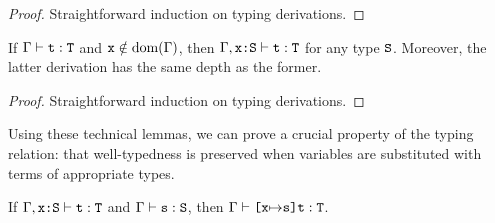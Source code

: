 \documentclass[11pt,twoside=off,numbers=noenddot]{scrbook}
\begin{document}
\begin{proof}
  Straightforward induction on typing derivations.
\end{proof}

\begin{lemma}[Weakening]
  If $\Gamma \vdash \texttt{t} : \texttt{T}$ and $\texttt{x} \notin \text{dom}(\Gamma)$,
  then $\Gamma, \texttt{x:S} \vdash \texttt{t} : \texttt{T}$ for any type
  $\texttt{S}$. Moreover, the latter derivation has the same depth as the former.
\end{lemma}

\begin{proof}
  Straightforward induction on typing derivations.
\end{proof}

Using these technical lemmas, we can prove a crucial property of the
typing relation: that well-typedness is preserved when variables are
substituted with terms of appropriate types.

\begin{lemma}
  If $\Gamma, \texttt{x:S} \vdash \texttt{t} : \texttt{T}$ and $\Gamma \vdash
  \texttt{s} : \texttt{S}$, then $\Gamma \vdash \texttt{[x$\mapsto$s]t} : \texttt{T}$.
\end{lemma}
\end{document}
